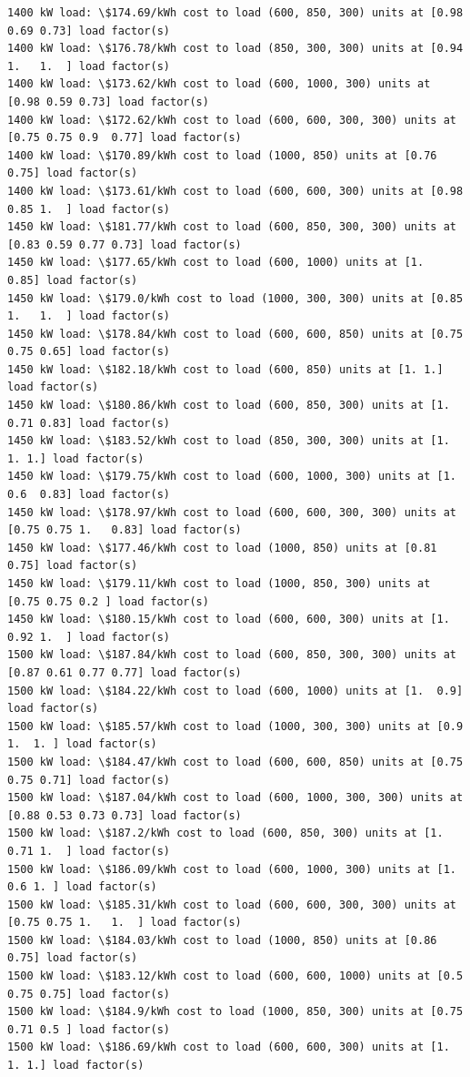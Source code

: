 \documentclass[11pt]{article}
\begin{document}
\begin{Verbatim}[commandchars=\\\{\}]
1400 kW load: \$174.69/kWh cost to load (600, 850, 300) units at [0.98 0.69 0.73] load factor(s)
1400 kW load: \$176.78/kWh cost to load (850, 300, 300) units at [0.94 1.   1.  ] load factor(s)
1400 kW load: \$173.62/kWh cost to load (600, 1000, 300) units at [0.98 0.59 0.73] load factor(s)
1400 kW load: \$172.62/kWh cost to load (600, 600, 300, 300) units at [0.75 0.75 0.9  0.77] load factor(s)
1400 kW load: \$170.89/kWh cost to load (1000, 850) units at [0.76 0.75] load factor(s)
1400 kW load: \$173.61/kWh cost to load (600, 600, 300) units at [0.98 0.85 1.  ] load factor(s)
1450 kW load: \$181.77/kWh cost to load (600, 850, 300, 300) units at [0.83 0.59 0.77 0.73] load factor(s)
1450 kW load: \$177.65/kWh cost to load (600, 1000) units at [1.   0.85] load factor(s)
1450 kW load: \$179.0/kWh cost to load (1000, 300, 300) units at [0.85 1.   1.  ] load factor(s)
1450 kW load: \$178.84/kWh cost to load (600, 600, 850) units at [0.75 0.75 0.65] load factor(s)
1450 kW load: \$182.18/kWh cost to load (600, 850) units at [1. 1.] load factor(s)
1450 kW load: \$180.86/kWh cost to load (600, 850, 300) units at [1.   0.71 0.83] load factor(s)
1450 kW load: \$183.52/kWh cost to load (850, 300, 300) units at [1. 1. 1.] load factor(s)
1450 kW load: \$179.75/kWh cost to load (600, 1000, 300) units at [1.   0.6  0.83] load factor(s)
1450 kW load: \$178.97/kWh cost to load (600, 600, 300, 300) units at [0.75 0.75 1.   0.83] load factor(s)
1450 kW load: \$177.46/kWh cost to load (1000, 850) units at [0.81 0.75] load factor(s)
1450 kW load: \$179.11/kWh cost to load (1000, 850, 300) units at [0.75 0.75 0.2 ] load factor(s)
1450 kW load: \$180.15/kWh cost to load (600, 600, 300) units at [1.   0.92 1.  ] load factor(s)
1500 kW load: \$187.84/kWh cost to load (600, 850, 300, 300) units at [0.87 0.61 0.77 0.77] load factor(s)
1500 kW load: \$184.22/kWh cost to load (600, 1000) units at [1.  0.9] load factor(s)
1500 kW load: \$185.57/kWh cost to load (1000, 300, 300) units at [0.9 1.  1. ] load factor(s)
1500 kW load: \$184.47/kWh cost to load (600, 600, 850) units at [0.75 0.75 0.71] load factor(s)
1500 kW load: \$187.04/kWh cost to load (600, 1000, 300, 300) units at [0.88 0.53 0.73 0.73] load factor(s)
1500 kW load: \$187.2/kWh cost to load (600, 850, 300) units at [1.   0.71 1.  ] load factor(s)
1500 kW load: \$186.09/kWh cost to load (600, 1000, 300) units at [1.  0.6 1. ] load factor(s)
1500 kW load: \$185.31/kWh cost to load (600, 600, 300, 300) units at [0.75 0.75 1.   1.  ] load factor(s)
1500 kW load: \$184.03/kWh cost to load (1000, 850) units at [0.86 0.75] load factor(s)
1500 kW load: \$183.12/kWh cost to load (600, 600, 1000) units at [0.5  0.75 0.75] load factor(s)
1500 kW load: \$184.9/kWh cost to load (1000, 850, 300) units at [0.75 0.71 0.5 ] load factor(s)
1500 kW load: \$186.69/kWh cost to load (600, 600, 300) units at [1. 1. 1.] load factor(s)

    \end{Verbatim}
\end{document}
